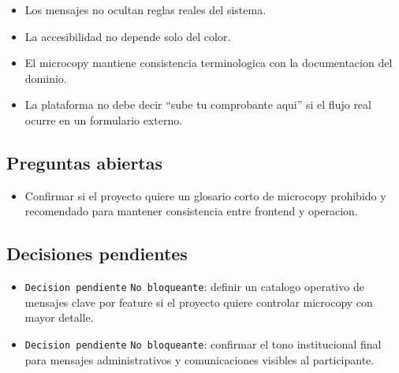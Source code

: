 \begin{itemize}
  \item Los mensajes no ocultan reglas reales del sistema.
  \item La accesibilidad no depende solo del color.
  \item El microcopy mantiene consistencia terminologica con la documentacion del dominio.
  \item La plataforma no debe decir ``sube tu comprobante aqui'' si el flujo real ocurre en un formulario externo.
\end{itemize}

\subsection{Preguntas abiertas}

\begin{itemize}
  \item Confirmar si el proyecto quiere un glosario corto de microcopy prohibido y recomendado para mantener consistencia entre frontend y operacion.
\end{itemize}

\subsection{Decisiones pendientes}

\begin{itemize}
  \item \texttt{Decision pendiente} \texttt{No bloqueante}: definir un catalogo operativo de mensajes clave por feature si el proyecto quiere controlar microcopy con mayor detalle.
  \item \texttt{Decision pendiente} \texttt{No bloqueante}: confirmar el tono institucional final para mensajes administrativos y comunicaciones visibles al participante.
\end{itemize}
